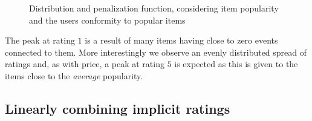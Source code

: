 \begin{figure}[H]
  \begin{subfigure}[b]{0.56\textwidth}
    \centering
  \end{subfigure}
  \begin{subfigure}[b]{0.5\textwidth}
    \centering
  \end{subfigure}
  \caption[Distribution of popularity based ratings]{Distribution and penalization function, considering item popularity
  and the users conformity to popular items}
  \label{fig:dist-popularity}
\end{figure}

The peak at rating $1$ is a result of many items having close to zero events
connected to them. More interestingly we observe an evenly distributed spread
of ratings and, as with price, a peak at rating $5$ is expected as this is
given to the items close to the \textit{average} popularity.

\subsection{Linearly combining implicit ratings}

